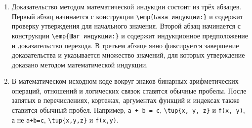\begin{enumerate}
    \item {}
        Доказательство методом математической индукции состоит из трёх абзацев.
        Первый абзац начинается с конструкции \verb|\emp{База индукции:}| и содержит проверку утверждения для начального значения.
        Второй абзац начинается с конструкции \verb|\emp{Шаг индукции:}| и содержит индукционное предположение и доказательство перехода.
        В третьем абзаце явно фиксируется завершение доказательства и указывается множество значений, для которых утверждение доказано методом математической индукции.

    \item {}
        В математическом исходном коде вокруг знаков бинарных арифметических операций, отношений и логических связок ставятся обычные пробелы.
        После запятых в перечислениях, кортежах, аргументах функций и индексах также ставится обычный пробел.
        Например, \verb|a + b = c|, \verb|\tup{x, y, z}| и \verb|f(x, y)|, а не \verb|a+b=c|, \verb|\tup{x,y,z}| и \verb|f(x,y)|.

\end{enumerate}